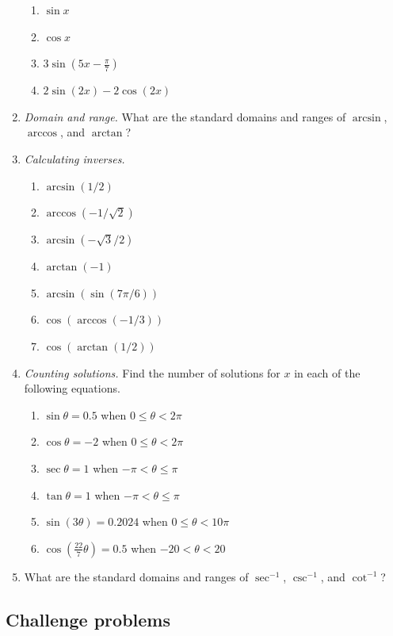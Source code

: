 \begin{enumerate}
\begin{enumerate}
\item $\sin x$
\item $\cos x$
\item $3\sin(5x - \tfrac{\pi}{7})$
\item $2\sin(2x) - 2\cos(2x)$
\end{enumerate}
\item \emph{Domain and range.} What are the standard domains and ranges of $\arcsin$, $\arccos$, and $\arctan$?\newpage
\item \emph{Calculating inverses.}
\begin{enumerate}
\item $\arcsin(1/2)$
\item $\arccos\left(-1/\sqrt{2}\right)$
\item $\arcsin\left(-\sqrt{3}/2\right)$
\item $\arctan(-1)$
\item $\arcsin(\sin(7\pi/6))$
\item $\cos(\arccos(-1/3))$
\item $\cos(\arctan(1/2))$
\end{enumerate}
\item \emph{Counting solutions.} Find the number of solutions for $x$ in each of the following equations.
\begin{enumerate}
\item $\sin\theta = 0.5$ when $0\leq\theta < 2\pi$
\item $\cos\theta = -2$ when $0\leq\theta < 2\pi$
\item $\sec\theta = 1$ when $-\pi < \theta\leq\pi$
\item $\tan\theta = 1$ when $-\pi < \theta\leq\pi$
\item $\sin(3\theta) = 0.2024$ when $0\leq\theta < 10\pi$
\item $\cos(\frac{22}{7}\theta) = 0.5$ when $-20 < \theta < 20$
\end{enumerate}
\item What are the standard domains and ranges of $\sec^{-1}$, $\csc^{-1}$, and $\cot^{-1}$?
\end{enumerate}


\subsection{Challenge problems}


